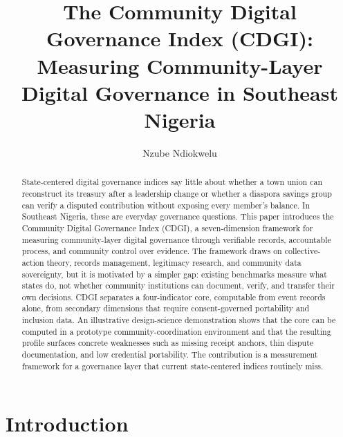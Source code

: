 \documentclass[sigconf]{acmart}
\begin{document}
\title{The Community Digital Governance Index (CDGI): Measuring Community-Layer Digital Governance in Southeast Nigeria}

\author{Nzube Ndiokwelu}

\begin{abstract}
State-centered digital governance indices say little about whether a town union can reconstruct its treasury after a leadership change or whether a diaspora savings group can verify a disputed contribution without exposing every member's balance. In Southeast Nigeria, these are everyday governance questions. This paper introduces the Community Digital Governance Index (CDGI), a seven-dimension framework for measuring community-layer digital governance through verifiable records, accountable process, and community control over evidence. The framework draws on collective-action theory, records management, legitimacy research, and community data sovereignty, but it is motivated by a simpler gap: existing benchmarks measure what states do, not whether community institutions can document, verify, and transfer their own decisions. CDGI separates a four-indicator core, computable from event records alone, from secondary dimensions that require consent-governed portability and inclusion data. An illustrative design-science demonstration shows that the core can be computed in a prototype community-coordination environment and that the resulting profile surfaces concrete weaknesses such as missing receipt anchors, thin dispute documentation, and low credential portability. The contribution is a measurement framework for a governance layer that current state-centered indices routinely miss.
\end{abstract}



\maketitle

\section{Introduction}
\end{document}
